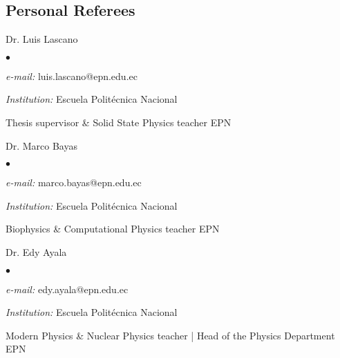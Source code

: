 \documentclass[margin,line]{res}
\newenvironment{list1}{
  \begin{list}{\ding{113}}{%
      \setlength{\itemsep}{0in}
      \setlength{\parsep}{0in} \setlength{\parskip}{0in}
      \setlength{\topsep}{0in} \setlength{\partopsep}{0in} 
      \setlength{\leftmargin}{0.17in}}}{\end{list}}
\newenvironment{list2}{
  \begin{list}{$\bullet$}{%
      \setlength{\itemsep}{0in}
      \setlength{\parsep}{0in} \setlength{\parskip}{0in}
      \setlength{\topsep}{0in} \setlength{\partopsep}{0in} 
      \setlength{\leftmargin}{0.2in}}}{\end{list}}
\begin{document}
\begin{resume}
\section{\sc Personal Referees}
 \begin{list1}
  \item[] Dr. Luis Lascano
  \begin{list2}
   \item {\it e-mail:} luis.lascano@epn.edu.ec
   \item {\it Institution:} Escuela Politécnica Nacional
   \item Thesis supervisor \& Solid State Physics teacher EPN
  \end{list2}
 \end{list1}
 
  \begin{list1}
  \item[] Dr. Marco Bayas
  \begin{list2}
   \item {\it e-mail:} marco.bayas@epn.edu.ec
   \item {\it Institution:} Escuela Politécnica Nacional
   \item Biophysics \& Computational Physics teacher EPN
  \end{list2}
 \end{list1}
%  

 \begin{list1}
  \item[] Dr. Edy Ayala
  \begin{list2}
   \item {\it e-mail:} edy.ayala@epn.edu.ec
   \item {\it Institution:} Escuela Politécnica Nacional
   \item Modern Physics \& Nuclear Physics teacher | Head of the Physics
Department EPN
  \end{list2}
 \end{list1}
 

\end{resume}
\end{document}
